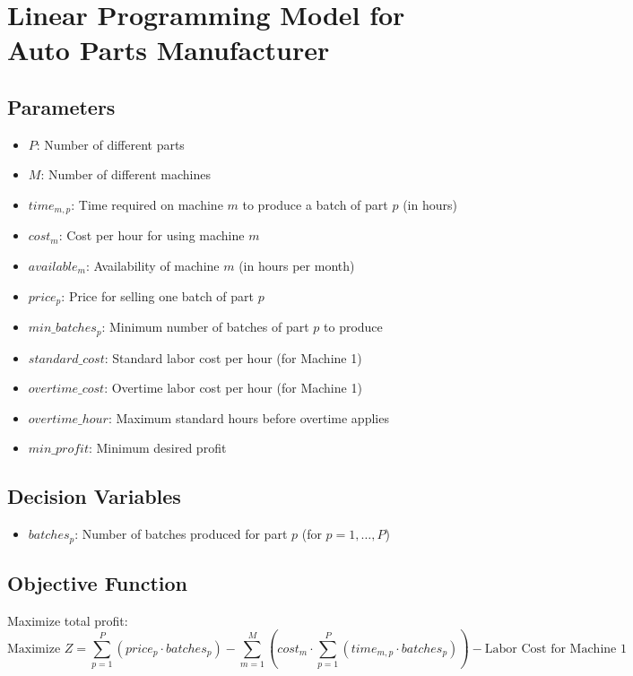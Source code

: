 \documentclass{article}
\begin{document}
\section*{Linear Programming Model for Auto Parts Manufacturer}

\subsection*{Parameters}
\begin{itemize}
    \item $P$: Number of different parts
    \item $M$: Number of different machines
    \item $time_{m,p}$: Time required on machine $m$ to produce a batch of part $p$ (in hours)
    \item $cost_{m}$: Cost per hour for using machine $m$
    \item $available_{m}$: Availability of machine $m$ (in hours per month)
    \item $price_{p}$: Price for selling one batch of part $p$
    \item $min\_batches_{p}$: Minimum number of batches of part $p$ to produce
    \item $standard\_cost$: Standard labor cost per hour (for Machine 1)
    \item $overtime\_cost$: Overtime labor cost per hour (for Machine 1)
    \item $overtime\_hour$: Maximum standard hours before overtime applies
    \item $min\_profit$: Minimum desired profit
\end{itemize}

\subsection*{Decision Variables}
\begin{itemize}
    \item $batches_p$: Number of batches produced for part $p$ (for $p = 1, \ldots, P$)
\end{itemize}

\subsection*{Objective Function}
Maximize total profit:
\[
\text{Maximize } Z = \sum_{p=1}^{P} (price_{p} \cdot batches_{p}) - \sum_{m=1}^{M} (cost_{m} \cdot \sum_{p=1}^{P} (time_{m,p} \cdot batches_{p})) - \text{Labor Cost for Machine 1}
\]
\end{document}
